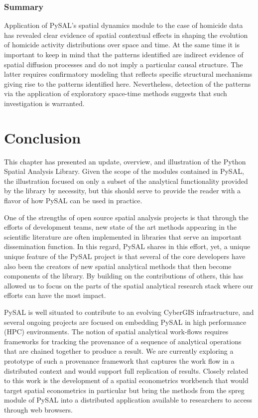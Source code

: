 \documentclass[11pt, titlepage]{amsart}
\begin{document}
\subsubsection{Summary}
Application of PySAL's  spatial dynamics module to the case of homicide data has
revealed clear evidence of spatial contextual effects in shaping the
evolution of homicide activity distributions over space and time. At the
same time it is important to keep in mind that the patterns identified
are indirect evidence of spatial diffusion processes and do not imply a
particular causal structure. The latter requires confirmatory modeling
that reflects specific structural mechanisms giving rise to the patterns
identified here. Nevertheless, detection of the patterns via the
application of exploratory space-time methods suggests that such investigation is
warranted.

\section{Conclusion}
This chapter has presented an update, overview, and illustration of the
Python Spatial Analysis Library. Given the scope of the modules
contained in PySAL, the illustration focused on only a subset of the
analytical functionality provided by the library by necessity, but this
should serve to provide the reader with a flavor of how PySAL can be
used in practice.

One of the strengths of open source spatial analysis projects is that
through the efforts of development teams, new state of the art methods
appearing in the scientific literature are often implemented in
libraries that serve an important dissemination function. In this
regard, PySAL shares in this effort, yet, a unique unique feature of the
PySAL project is that several of the core developers have also been the
creators of new spatial analytical methods that then become components
of the library. By building on the contributions of others, this has
allowed us to focus on the parts of the spatial analytical research
stack where our efforts can have the most impact.

PySAL is well situated to contribute to an evolving CyberGIS
infrastructure, and several ongoing projects are focused on embedding
PySAL in high performance (HPC) environments. The notion of spatial analytical work-flows
requires frameworks for tracking the provenance of a sequence of
analytical operations that are chained together to produce a result. We
are currently exploring a prototype of such a provenance framework that
captures the work flow in a distributed context and would support full
replication of results.  Closely related to this work is the development of a spatial
econometrics workbench \citep{Anselin:2011wt} that would target spatial econometrics in
particular but bring the methods from the spreg module of PySAL into a
distributed application available to researchers to access through web browsers.
\end{document}
